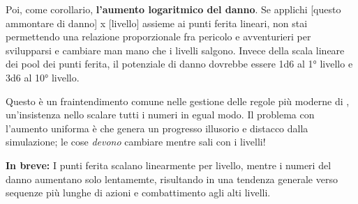Poi, come corollario, \textbf{l'aumento logaritmico del danno}. Se applichi [questo ammontare di danno] x [livello] assieme ai punti ferita lineari, non stai permettendo una relazione proporzionale fra pericolo e avventurieri per svilupparsi e cambiare man mano che i livelli salgono. Invece della scala lineare dei pool dei punti ferita, il potenziale di danno dovrebbe essere 1d6 al 1° livello e 3d6 al 10° livello.

Questo è un fraintendimento comune nelle gestione delle regole più moderne di \dnd{}, un'insistenza nello scalare tutti i numeri in egual modo. Il problema con l'aumento uniforma è che genera un progresso illusorio e distacco dalla simulazione; le cose \textit{devono} cambiare mentre sali con i livelli!

\textbf{In breve:} I punti ferita scalano linearmente per livello, mentre i numeri del danno aumentano solo lentamemte, risultando in una tendenza generale verso sequenze più lunghe di azioni e combattimento agli alti livelli.
